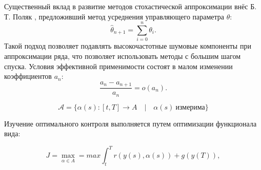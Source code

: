 Существенный вклад в развитие методов стохастической аппроксимации внёс Б. Т. Поляк \cite{polyak1990new},
предложивший метод усреднения управляющего параметра $\theta$:
 \begin{equation}
     \hat{\theta}_{n+1} = \sum_{i=0}^n \theta_i.
     \label{polyak}
 \end{equation}
Такой подход позволяет подавлять высокочастотные шумовые компоненты при аппроксимации ряда, что позволяет использовать 
методы с большим шагом спуска. Условия эффективной применимости состоят в малом изменении коэффициентов $a_n$:
 \begin{equation}
    \frac{a_{n}-a_{n+1}}{a_{n}}=\mathit{o}(a_{n}).
    \label{polyak_assumptions}
 \end{equation}








\begin{equation}
    \mathcal{A} = \{\alpha(s): [t,T] \rightarrow A \quad | \quad \alpha(s)\ \text{измерима}\}    
\end{equation}

Изучение оптимального контроля выполняется путем оптимизации функционала вида:

\begin{equation}
    J = \max_{\alpha \in A} = max \int_{t}^T r(y(s),\alpha(s)) + g(y(T)),
\end{equation}


